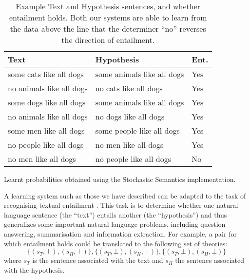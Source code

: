 \documentclass[manuscript]{clv2}
\begin{document}
\begin{table}
  \begin{center}
    \begin{tabular}{l|l|l}
      Text & Hypothesis & Ent.\\
      \hline
      some cats like all dogs & some animals like all dogs & Yes\\
      no animals like all dogs & no cats like all dogs & Yes\\
      some dogs like all dogs & some animals like all dogs & Yes\\
      no animals like all dogs & no dogs like all dogs & Yes\\
      some men like all dogs & some people like all dogs & Yes\\
      \hline
      no people like all dogs & no men like all dogs & Yes\\
      no men like all dogs & no people like all dogs & No\\
    \end{tabular}
    \vspace{0.2cm}
    \caption{Example Text and Hypothesis sentences, and whether
      entailment holds. Both our systems are able to learn from the
      data above the line that the determiner ``no'' reverses the
      direction of entailment.}
    \label{table:mono}
  \end{center}
\end{table}

\begin{table}
  \centering


  \vspace{0.2cm}
  \caption{Learnt probabilities obtained using the
    Stochastic Semantics implementation.}
  \label{table:lexical-sato}
\end{table}

A learning system such as those we have described can be adapted to
the task of recognising textual entailment \cite{Dagan:05}. This task is
to determine whether one natural language sentence (the ``text'')
entails another (the ``hypothesis'') and thus generalizes some
important natural language problems, including question answering,
summarisation and information extraction.  For example, a pair for
which entailment holds could be translated to the following set of
theories:
\[
\{(s_T,\top),(s_H,\top)\},  \{(s_T,\bot),(s_H,\top)\},\{(s_T,\bot),(s_H,\bot)\}
\]
where $s_T$ is the sentence associated with the text and $s_H$ the
sentence associated with the hypothesis.
\end{document}
